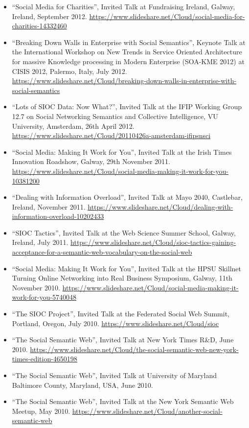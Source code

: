 \documentclass[10pt,a4paper]{res} %
\begin{document}
\begin{resume}
\begin{itemize}
\item ``Social Media for Charities'', Invited Talk at Fundraising Ireland, Galway, Ireland, September 2012. \url{https://www.slideshare.net/Cloud/social-media-for-charities-14332460}
\item ``Breaking Down Walls in Enterprise with Social Semantics'', Keynote Talk at the International Workshop on New Trends in Service Oriented Architecture for massive Knowledge processing in Modern Enterprise (SOA-KME 2012) at CISIS 2012, Palermo, Italy, July 2012. \url{https://www.slideshare.net/Cloud/breaking-down-walls-in-enterprise-with-social-semantics}
\item ``Lots of SIOC Data: Now What?'', Invited Talk at the IFIP Working Group 12.7 on Social Networking Semantics and Collective Intelligence, VU University, Amsterdam, 26th April 2012. \url{https://www.slideshare.net/Cloud/20110426a-amsterdam-ifipsnsci}
\item ``Social Media: Making It Work for You'', Invited Talk at the Irish Times Innovation Roadshow, Galway, 29th November 2011. \url{https://www.slideshare.net/Cloud/social-media-making-it-work-for-you-10381200}
\item ``Dealing with Information Overload'', Invited Talk at Mayo 2040, Castlebar, Ireland, November 2011. \url{https://www.slideshare.net/Cloud/dealing-with-information-overload-10202433}
\item ``SIOC Tactics'', Invited Talk at the Web Science Summer School, Galway, Ireland, July 2011. \url{https://www.slideshare.net/Cloud/sioc-tactics-gaining-acceptance-for-a-semantic-web-vocabulary-on-the-social-web}
\item ``Social Media: Making It Work for You'', Invited Talk at the HPSU Skillnet Turning Online Networking into Real Business Symposium, Galway, 11th November 2010. \url{https://www.slideshare.net/Cloud/social-media-making-it-work-for-you-5740048}
\item ``The SIOC Project'', Invited Talk at the Federated Social Web Summit, Portland, Oregon, July 2010. \url{https://www.slideshare.net/Cloud/sioc}
\item ``The Social Semantic Web'', Invited Talk at New York Times R\&D, June 2010. \url{https://www.slideshare.net/Cloud/the-social-semantic-web-new-york-times-edition-4650198}
\item ``The Social Semantic Web'', Invited Talk at University of Maryland Baltimore County, Maryland, USA, June 2010. %
\item ``The Social Semantic Web'', Invited Talk at the New York Semantic Web Meetup, May 2010. \url{https://www.slideshare.net/Cloud/another-social-semantic-web}

\end{itemize}
\end{resume}
\end{document}
